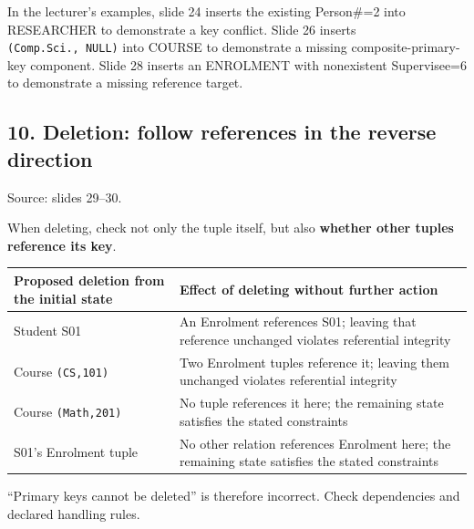 In the lecturer's examples, slide 24 inserts the existing Person\#=2 into RESEARCHER to demonstrate a key conflict. Slide 26 inserts \texttt{(\allowbreak{}Comp.\allowbreak{}Sci.\allowbreak{},\allowbreak{}\ NULL)\allowbreak{}} into COURSE to demonstrate a missing composite-primary-key component. Slide 28 inserts an ENROLMENT with nonexistent Supervisee=6 to demonstrate a missing reference target.

\subsection{10. Deletion: follow references in the reverse direction}\label{03_relational_model_and_integrity_en-deletion-follow-references-in-the-reverse-direction}

Source: slides 29--30.

When deleting, check not only the tuple itself, but also \textbf{whether other tuples reference its key}.

\begin{longtable}[]{@{}
  >{\raggedright\arraybackslash}p{}
  >{\raggedright\arraybackslash}p{}@{}}
\toprule\noalign{}
\begin{minipage}[b]{\linewidth}\raggedright
Proposed deletion from the initial state
\end{minipage} & \begin{minipage}[b]{\linewidth}\raggedright
Effect of deleting without further action
\end{minipage} \\
\midrule\noalign{}
\endhead
\bottomrule\noalign{}
\endlastfoot
Student S01 & An Enrolment references S01; leaving that reference unchanged violates referential integrity \\
Course \texttt{(\allowbreak{}CS,\allowbreak{}101)\allowbreak{}} & Two Enrolment tuples reference it; leaving them unchanged violates referential integrity \\
Course \texttt{(\allowbreak{}Math,\allowbreak{}201)\allowbreak{}} & No tuple references it here; the remaining state satisfies the stated constraints \\
S01's Enrolment tuple & No other relation references Enrolment here; the remaining state satisfies the stated constraints \\
\end{longtable}

``Primary keys cannot be deleted'' is therefore incorrect. Check dependencies and declared handling rules.

